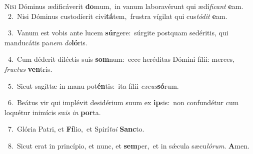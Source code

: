 \lettrine{\initial\textcolor{\initialcolor}{N}}{isi} Dóminus ædificáverit \textbf{do}\-mum,~\star in vanum laboravérunt qui ædí\-\textit{fi}\-\textit{cant} \textbf{e}\-am.\\
{\numbfont\textcolor{\numbcolor}{~2.}}~Nisi Dóminus custodíerit civi\-\textbf{tá}\-tem,~\star frustra vígilat qui cus\-\textit{tó}\-\textit{dit} \textbf{e}\-am.\par
{\numbfont\textcolor{\numbcolor}{~3.}}~Vanum est vobis ante lucem \textbf{súr}\-gere:~\star súrgite postquam sedéritis, qui manducátis pa\textit{nem} \textit{do}\-\textbf{ló}ris.\par
{\numbfont\textcolor{\numbcolor}{~4.}}~Cum déderit diléctis suis \textbf{som}\-num:~\star ecce heréditas Dómini fílii: merces, \textit{fruc}\-\textit{tus} \textbf{ven}\-tris.\par
{\numbfont\textcolor{\numbcolor}{~5.}}~Sicut sagíttæ in manu pot\-\textbf{én}\-tis:~\star ita fílii \textit{ex}\-\textit{cus}\textbf{só}rum.\par
{\numbfont\textcolor{\numbcolor}{~6.}}~Beátus vir qui implévit desidérium suum ex \textbf{ip}\-sis:~\star non confundétur cum loquétur inimícis su\textit{is} \textit{in} \textbf{por}\-ta.\par
{\numbfont\textcolor{\numbcolor}{~7.}}~Glória Patri, et \textbf{Fí}\-lio,~\star et Spirí\-\textit{tu}\-\textit{i} \textbf{Sanc}\-to.\par
{\numbfont\textcolor{\numbcolor}{~8.}}~Sicut erat in princípio, et nunc, et \textbf{sem}\-per,~\star et in sǽcula sæcu\-\textit{ló}\-\textit{rum}. \textbf{A}\-men.\par
